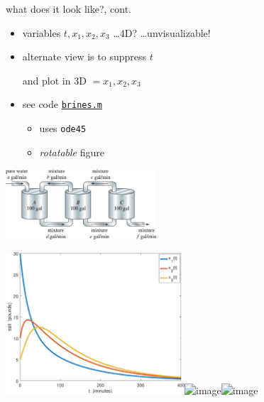 \documentclass[dvipsnames,colorlinks]{beamer}
\begin{document}
\begin{frame}{what does it look like?, cont.}

\begin{itemize}
\item variables $t,x_1,x_2,x_3$ \dots 4D? \dots unvisualizable!
\item alternate view is to suppress $t$

and plot in 3D $=x_1,x_2,x_3$
\item see code \href{https://bueler.github.io/math302/assets/codes/F23/brines.m}{\texttt{brines.m}}
    \begin{itemize}
    \item<2> uses \texttt{ode45}
    \item<2> \emph{rotatable} figure
    \end{itemize}
\end{itemize}

\vspace{-21mm}
\hfill \includegraphics[width=0.42\textwidth]{figs/three-tanks}

\mbox{\includegraphics[width=0.5\textwidth]{figs/brines-xvt}\quad \includegraphics<1>[width=0.5\textwidth]{figs/brines-3d}\includegraphics<2>[width=0.5\textwidth]{figs/brines-3d-again}}
\end{frame}
\end{document}
